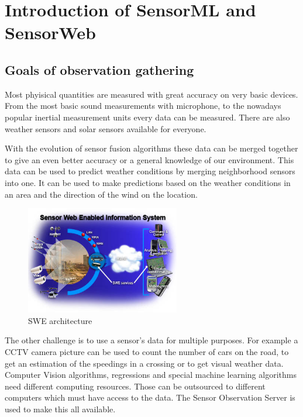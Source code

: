 \chapter{Introduction of SensorML and SensorWeb}\label{sect:Introduction}
\section{Goals of observation gathering}
Most phyisical quantities are measured with great accuracy on very basic devices. From the most basic sound measurements with microphone, to the nowadays popular inertial measurement units every data can be measured. There are also weather sensors and solar sensors available for everyone.

 With the evolution of sensor fusion algorithms these data can be merged together to give an even better accuracy or a general knowledge of our environment. This data can be used to predict weather conditions by merging neighborhood sensors into one. It can be used to make predictions based on the weather conditions in an area and the direction of the wind on the location.
 
 \begin{figure}[h]
 \centering
  \includegraphics[width=0.6\textwidth]{figures/webswe.png}
 \caption{SWE architecture\label{fig:webswe}}
 \end{figure}
 
 
 The other challenge is to use a sensor's data for multiple purposes. For example a CCTV camera picture can be used to count the number of cars on the road, to get an estimation of the speedings in a crossing or to get visual weather data. Computer Vision algorithms, regressions and special machine learning algorithms need different computing resources. Those can be outsourced to different computers which must have access to the data. The Sensor Observation Server is used to make this all available.
 
